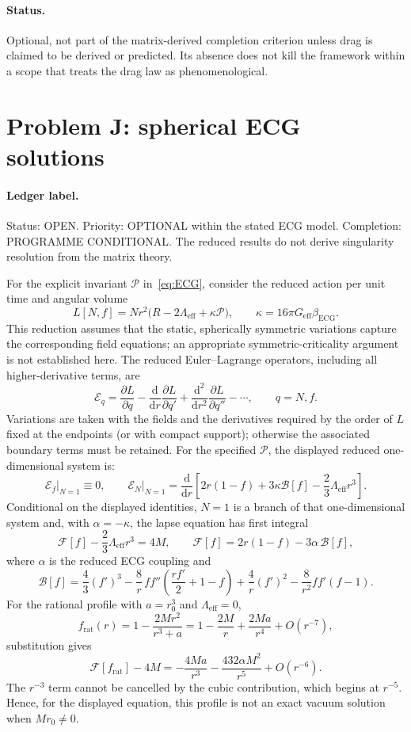 \paragraph{Status.}
Optional, not part of the matrix-derived completion criterion unless
drag is claimed to be derived or predicted. Its absence does not kill
the framework within a scope that treats the drag law as
phenomenological.

\section{Problem J: spherical ECG solutions}
\label{sec:status-J}

\paragraph{Ledger label.}
Status: OPEN. Priority: OPTIONAL within the stated ECG model.
Completion: PROGRAMME CONDITIONAL. The reduced results do not derive
singularity resolution from the matrix theory.

For the explicit invariant \(\mathcal P\) in~\eqref{eq:ECG}, consider
the reduced action per unit time and angular volume
\[
L[N,f]=N r^2\bigl(R-2\Lambda_{\mathrm{eff}}+\kappa\mathcal P\bigr),
\qquad
\kappa=16\pi G_{\mathrm{eff}}\beta_{\mathrm{ECG}}.
\]
This reduction assumes that the static, spherically symmetric
variations capture the corresponding field equations; an appropriate
symmetric-criticality argument is not established here. The reduced
Euler--Lagrange operators, including all higher-derivative terms, are
\[
\mathcal E_q
=\frac{\partial L}{\partial q}
-\frac{\mathrm d}{\mathrm dr}\frac{\partial L}{\partial q'}
+\frac{\mathrm d^2}{\mathrm dr^2}\frac{\partial L}{\partial q''}
-\cdots,\qquad q=N,f.
\]
Variations are taken with the fields and the derivatives required by
the order of \(L\) fixed at the endpoints (or with compact support);
otherwise the associated boundary terms must be retained. For the
specified \(\mathcal P\), the displayed reduced one-dimensional
system is:
\[
\left.\mathcal E_f\right|_{N=1}\equiv0,\qquad
\left.\mathcal E_N\right|_{N=1}
=\frac{\mathrm d}{\mathrm dr}
\left[2r(1-f)+3\kappa\mathcal B[f]
-\frac23\Lambda_{\mathrm{eff}}r^3\right].
\]
Conditional on the displayed identities, \(N=1\) is a branch of that one-dimensional system and, with \(\alpha=-\kappa\), the lapse equation has first integral
\[
\mathcal F[f]-\frac23\Lambda_{\mathrm{eff}}r^3=4M,\qquad
\mathcal F[f]=2r(1-f)-3\alpha\,\mathcal B[f],
\]
where \(\alpha\) is the reduced ECG coupling and
\[
\mathcal B[f]
=
\frac43(f')^3
-\frac8r\,ff''
 \left(\frac{rf'}2+1-f\right)
+\frac4r(f')^2
-\frac8{r^2}ff'(f-1).
\]
For the rational profile with \(a=r_0^3\) and
\(\Lambda_{\mathrm{eff}}=0\),
\[
f_{\mathrm{rat}}(r)
=
1-\frac{2Mr^2}{r^3+a}
=
1-\frac{2M}{r}+\frac{2Ma}{r^4}+O(r^{-7}),
\]
substitution gives
\[
\mathcal F[f_{\mathrm{rat}}]-4M
=-\frac{4Ma}{r^3}-\frac{432\alpha M^2}{r^5}+O(r^{-6}).
\]
The \(r^{-3}\) term cannot be cancelled by the cubic contribution,
which begins at \(r^{-5}\). Hence, for the displayed equation, this
profile is not an exact vacuum solution when \(Mr_0\ne0\).

